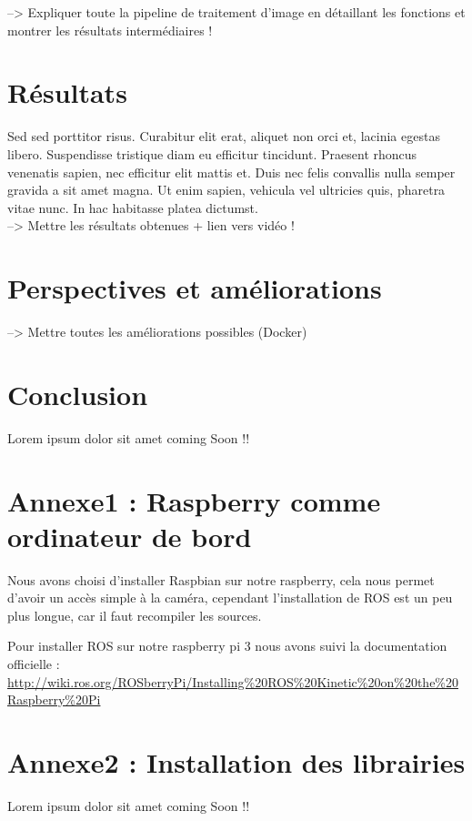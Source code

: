 \documentclass[12pt, openany]{report}
\begin{document}
--> Expliquer toute la pipeline de traitement d'image en détaillant les fonctions et montrer les résultats intermédiaires !

\section{Résultats}
Sed sed porttitor risus. Curabitur elit erat, aliquet non orci et, lacinia egestas libero. Suspendisse tristique diam eu efficitur tincidunt. Praesent rhoncus venenatis sapien, nec efficitur elit mattis et. Duis nec felis convallis nulla semper gravida a sit amet magna. Ut enim sapien, vehicula vel ultricies quis, pharetra vitae nunc. In hac habitasse platea dictumst.\\

--> Mettre les résultats obtenues + lien vers vidéo !

\section{Perspectives et améliorations}
--> Mettre toutes les améliorations possibles (Docker)

\section*{Conclusion}
Lorem ipsum dolor sit amet
coming Soon !!

\section*{Annexe1 : Raspberry comme ordinateur de bord}

Nous avons choisi d'installer Raspbian sur notre raspberry, cela nous permet d'avoir un accès simple à la caméra, cependant l'installation de ROS est un peu plus longue, car il faut recompiler les sources.

Pour installer ROS sur notre raspberry pi 3 nous avons suivi la documentation officielle :  \url{http://wiki.ros.org/ROSberryPi/Installing%20ROS%20Kinetic%20on%20the%20Raspberry%20Pi}



\section*{Annexe2 : Installation des librairies}
Lorem ipsum dolor sit amet
coming Soon !!
\end{document}
